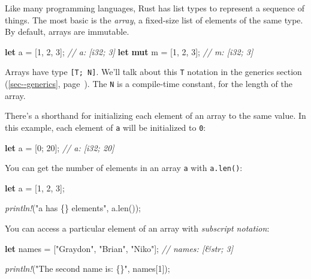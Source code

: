 \documentclass[a4paper,]{book}
\renewcommand*{\hyperref}[2][\ar]{%
  \def\ar{#2}%
  #2 (\autoref{#1}, page~\pageref{#1})}
\newenvironment{Shaded}{\begin{snugshade}}{\end{snugshade}}
\newcommand{\KeywordTok}[1]{\textcolor[rgb]{0.13,0.29,0.53}{\textbf{{#1}}}}
\newcommand{\DecValTok}[1]{\textcolor[rgb]{0.00,0.00,0.81}{{#1}}}
\newcommand{\StringTok}[1]{\textcolor[rgb]{0.31,0.60,0.02}{{#1}}}
\newcommand{\CommentTok}[1]{\textcolor[rgb]{0.56,0.35,0.01}{\textit{{#1}}}}
\newcommand{\PreprocessorTok}[1]{\textcolor[rgb]{0.56,0.35,0.01}{\textit{{#1}}}}
\newcommand{\NormalTok}[1]{{#1}}
\begin{document}
Like many programming languages, Rust has list types to represent a
sequence of things. The most basic is the \emph{array}, a fixed-size
list of elements of the same type. By default, arrays are immutable.

\begin{Shaded}
\begin{Highlighting}[]
\KeywordTok{let} \NormalTok{a = [}\DecValTok{1}\NormalTok{, }\DecValTok{2}\NormalTok{, }\DecValTok{3}\NormalTok{]; }\CommentTok{// a: [i32; 3]}
\KeywordTok{let} \KeywordTok{mut} \NormalTok{m = [}\DecValTok{1}\NormalTok{, }\DecValTok{2}\NormalTok{, }\DecValTok{3}\NormalTok{]; }\CommentTok{// m: [i32; 3]}
\end{Highlighting}
\end{Shaded}

Arrays have type \texttt{{[}T;\ N{]}}. We'll talk about this \texttt{T}
notation \hyperref[sec--generics]{in the generics section}. The
\texttt{N} is a compile-time constant, for the length of the array.

There's a shorthand for initializing each element of an array to the
same value. In this example, each element of \texttt{a} will be
initialized to \texttt{0}:

\begin{Shaded}
\begin{Highlighting}[]
\KeywordTok{let} \NormalTok{a = [}\DecValTok{0}\NormalTok{; }\DecValTok{20}\NormalTok{]; }\CommentTok{// a: [i32; 20]}
\end{Highlighting}
\end{Shaded}

You can get the number of elements in an array \texttt{a} with
\texttt{a.len()}:

\begin{Shaded}
\begin{Highlighting}[]
\KeywordTok{let} \NormalTok{a = [}\DecValTok{1}\NormalTok{, }\DecValTok{2}\NormalTok{, }\DecValTok{3}\NormalTok{];}

\PreprocessorTok{println!}\NormalTok{(}\StringTok{"a has \{\} elements"}\NormalTok{, a.len());}
\end{Highlighting}
\end{Shaded}

You can access a particular element of an array with \emph{subscript
notation}:

\begin{Shaded}
\begin{Highlighting}[]
\KeywordTok{let} \NormalTok{names = [}\StringTok{"Graydon"}\NormalTok{, }\StringTok{"Brian"}\NormalTok{, }\StringTok{"Niko"}\NormalTok{]; }\CommentTok{// names: [&str; 3]}

\PreprocessorTok{println!}\NormalTok{(}\StringTok{"The second name is: \{\}"}\NormalTok{, names[}\DecValTok{1}\NormalTok{]);}
\end{Highlighting}
\end{Shaded}
\end{document}
